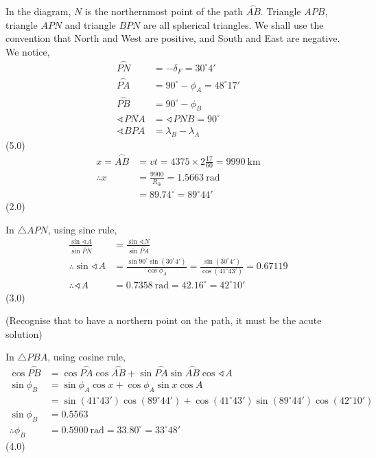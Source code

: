 
In the diagram, $N$ is the northernmost point of the path
$\overset{\frown}{AB}$. Triangle $APB$, triangle $APN$ and triangle $BPN$ are
all spherical triangles. We shall use the convention that North and West are
positive, and South and East are negative. We notice,
\begin{align*}
  \overset{\frown}{PN} &= -\delta_F = 30^\circ 4'\\
  \overset{\frown}{PA} &= 90^\circ - \phi_A = 48^\circ 17'\\
  \overset{\frown}{PB} &= 90^\circ - \phi_B\\
  \sphericalangle PNA &= \sphericalangle PNB = 90^\circ\\
  \sphericalangle BPA &= \lambda_B - \lambda_A
\end{align*}
\hfill(5.0)
\begin{align*}
  x = \overset{\frown}{AB} &= vt = 4375 \times 2\tfrac{17}{60}
    = 9990\ \mathrm{km}\\
  \therefore x &= \frac{9900}{R_\oplus} = 1.5663\ \mathrm{rad}
  \\
  &= 89.74^\circ = 89^\circ 44'
\end{align*}
\hfill(2.0)

In $\triangle APN$, using sine rule,
\begin{align*}
  \frac{\sin\sphericalangle A}{\sin\overset{\frown}{PN}}
    &= \frac{\sin\sphericalangle N}{\sin\overset{\frown}{PA}}\\
  \therefore \sin\sphericalangle A
    &= \frac{\sin 90^\circ \sin(30^\circ 4')}{\cos\phi_A}
     = \frac{\sin(30^\circ 4')}{\cos(41^\circ 43')} = 0.67119\\
  \therefore \sphericalangle A
    &= 0.7358\ \mathrm{rad} = 42.16^\circ = 42^\circ 10'
\end{align*}
\hfill(3.0)

(Recognise that to have a northern point on the path, it must be the acute
solution)

In $\triangle PBA$, using cosine rule,
\begin{align*}
  \cos\overset{\frown}{PB}
    &= \cos\overset{\frown}{PA}\cos\overset{\frown}{AB}
     + \sin\overset{\frown}{PA}\sin\overset{\frown}{AB}
       \cos\sphericalangle A\\
  \sin\phi_B &= \sin\phi_A \cos x + \cos\phi_A \sin x \cos A\\
    &= \sin(41^\circ 43')\cos(89^\circ 44')
     + \cos(41^\circ 43')\sin(89^\circ 44')\cos(42^\circ 10')\\
  \sin\phi_B &= 0.5563\\
  \therefore \phi_B &= 0.5900\ \mathrm{rad} = 33.80^\circ = 33^\circ 48'
\end{align*}
\hfill(4.0)

